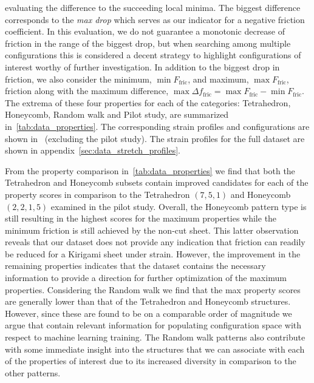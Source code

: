 evaluating the difference to the succeeding local minima. The biggest difference
corresponds to the \textit{max drop} which serves as our indicator for a
negative friction coefficient. In this evaluation, we do not guarantee a
monotonic decrease of friction in the range of the biggest drop, but when
searching among multiple configurations this is considered a decent strategy to
highlight configurations of interest worthy of further investigation. In
addition to the biggest drop in friction, we also consider the minimum, $\min
F_{\text{fric}}$, and maximum, $\max F_{\text{fric}}$, friction along with the
maximum difference, $\max \Delta f_{\text{fric}} = \max F_{\text{fric}} - \min
F_{\text{fric}}$. The extrema of these four properties for each of the
categories: Tetrahedron, Honeycomb, Random walk and Pilot study, are summarized
in~\cref{tab:data_properties}. The corresponding strain profiles and
configurations are shown in~ (excluding
the pilot study). The strain profiles for the full dataset are shown in
appendix~\ref {sec:data_stretch_profiles}. 

From the property comparison in~\cref{tab:data_properties} we find that both the
Tetrahedron and Honeycomb subsets contain improved candidates for each of the
property scores in comparison to the Tetrahedron $(7,5,1)$ and Honeycomb
$(2,2,1,5)$ examined in the pilot study. Overall, the Honeycomb pattern type is
still resulting in the highest scores for the maximum properties while the
minimum friction is still achieved by the non-cut sheet. This latter observation
reveals that our dataset does not provide any indication that friction can readily be reduced for a Kirigami sheet under strain. However, the improvement in the
remaining properties indicates that the dataset contains the necessary
information to provide a direction for further optimization of the maximum properties. Considering the Random walk we find that the max property scores are generally lower than that of the Tetrahedron and Honeycomb structures. However, since these are found to be on a comparable order of magnitude we argue that contain relevant information for populating configuration space with respect to machine learning training. The Random walk patterns also contribute with some immediate insight into the structures that we can associate with each of the properties of interest due to its increased diversity in comparison to the other patterns.

